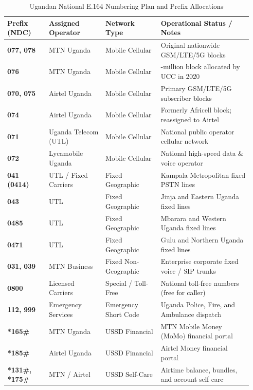 \documentclass[12pt,a4paper]{report}
\begin{document}
\begin{table}[H]
\centering
\small
\renewcommand{\arraystretch}{1.25}
\begin{tabularx}{\textwidth}{|>{\bfseries}p{2.8cm}|>{\raggedright\arraybackslash}p{3.5cm}|>{\raggedright\arraybackslash}p{3.2cm}|>{\raggedright\arraybackslash}X|}
\hline
\textbf{Prefix (NDC)} & \textbf{Assigned Operator} & \textbf{Network Type} & \textbf{Operational Status / Notes} \\ \hline
077, 078 & MTN Uganda & Mobile Cellular & Original nationwide GSM/LTE/5G blocks \\ \hline
076 & MTN Uganda & Mobile Cellular & 10-million block allocated by UCC in 2020 \\ \hline
070, 075 & Airtel Uganda & Mobile Cellular & Primary GSM/LTE/5G subscriber blocks \\ \hline
074 & Airtel Uganda & Mobile Cellular & Formerly Africell block; reassigned to Airtel \\ \hline
071 & Uganda Telecom (UTL) & Mobile Cellular & National public operator cellular network \\ \hline
072 & Lycamobile Uganda & Mobile Cellular & National high-speed data \& voice operator \\ \hline
041 (0414) & UTL / Fixed Carriers & Fixed Geographic & Kampala Metropolitan fixed PSTN lines \\ \hline
043 & UTL & Fixed Geographic & Jinja and Eastern Uganda fixed lines \\ \hline
0485 & UTL & Fixed Geographic & Mbarara and Western Uganda fixed lines \\ \hline
0471 & UTL & Fixed Geographic & Gulu and Northern Uganda fixed lines \\ \hline
031, 039 & MTN Business & Fixed Non-Geographic & Enterprise corporate fixed voice / SIP trunks \\ \hline
0800 & Licensed Carriers & Special / Toll-Free & National toll-free numbers (free for caller) \\ \hline
112, 999 & Emergency Services & Emergency Short Code & Uganda Police, Fire, and Ambulance dispatch \\ \hline
*165\# & MTN Uganda & USSD Financial & MTN Mobile Money (MoMo) financial portal \\ \hline
*185\# & Airtel Uganda & USSD Financial & Airtel Money financial portal \\ \hline
*131\#, *175\# & MTN / Airtel & USSD Self-Care & Airtime balance, bundles, and account self-care \\ \hline
\end{tabularx}
\caption{Ugandan National E.164 Numbering Plan and Prefix Allocations}
\label{tab:uganda_numbering_plan}
\end{table}
\end{document}
